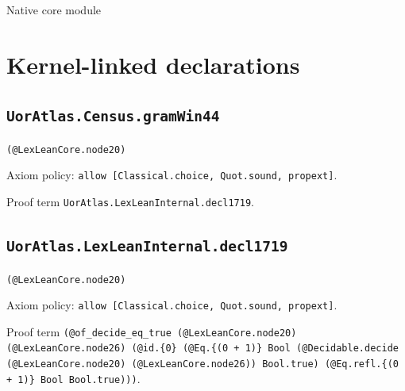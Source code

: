 \documentclass[11pt]{article}
\begin{document}
\begin{center}{\LARGE Native core module}\end{center}
\section*{Kernel-linked declarations}
\subsection*{\texttt{UorAtlas.Census.gramWin44}}
\noindent\texttt{(@LexLeanCore.node20)}\par
\noindent Axiom policy: \texttt{allow [Classical.choice, Quot.sound, propext]}.\par
\noindent Proof term \texttt{UorAtlas.LexLeanInternal.decl1719}.\par
\subsection*{\texttt{UorAtlas.LexLeanInternal.decl1719}}
\noindent\texttt{(@LexLeanCore.node20)}\par
\noindent Axiom policy: \texttt{allow [Classical.choice, Quot.sound, propext]}.\par
\noindent Proof term \texttt{(@of\_decide\_eq\_true (@LexLeanCore.node20) (@LexLeanCore.node26) (@id.\{0\} (@Eq.\{(0 + 1)\} Bool (@Decidable.decide (@LexLeanCore.node20) (@LexLeanCore.node26)) Bool.true) (@Eq.refl.\{(0 + 1)\} Bool Bool.true)))}.\par
\end{document}
